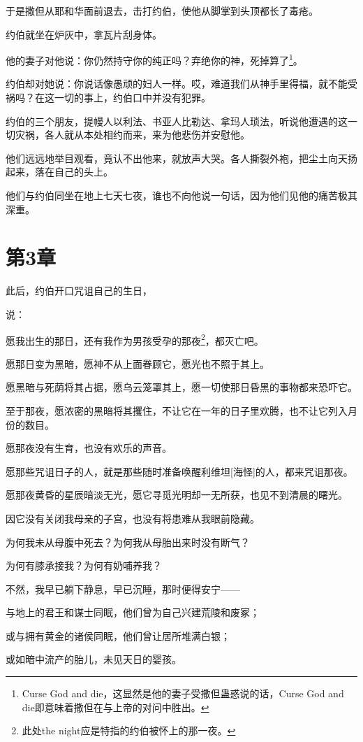 \documentclass[12pt,oneside]{book}
\begin{document}
于是撒但从耶和华面前退去，击打约伯，使他从脚掌到头顶都长了毒疮。

约伯就坐在炉灰中，拿瓦片刮身体。

他的妻子对他说：你仍然持守你的纯正吗？弃绝你的神，死掉算了\footnote{Curse God and die，这显然是他的妻子受撒但蛊惑说的话，Curse God and die即意味着撒但在与上帝的对问中胜出。}。

约伯却对她说：你说话像愚顽的妇人一样。哎，难道我们从神手里得福，就不能受祸吗？在这一切的事上，约伯口中并没有犯罪。

约伯的三个朋友，提幔人以利法、书亚人比勒达、拿玛人琐法，听说他遭遇的这一切灾祸，各人就从本处相约而来，来为他悲伤并安慰他。

他们远远地举目观看，竟认不出他来，就放声大哭。各人撕裂外袍，把尘土向天扬起来，落在自己的头上。

他们与约伯同坐在地上七天七夜，谁也不向他说一句话，因为他们见他的痛苦极其深重。


\chapter{第3章}
此后，约伯开口咒诅自己的生日，

说：

愿我出生的那日，还有我作为男孩受孕的那夜\footnote{此处the night应是特指的约伯被怀上的那一夜。}，都灭亡吧。

愿那日变为黑暗，愿神不从上面眷顾它，愿光也不照于其上。

愿黑暗与死荫将其占据，愿乌云笼罩其上，愿一切使那日昏黑的事物都来恐吓它。

至于那夜，愿浓密的黑暗将其攫住，不让它在一年的日子里欢腾，也不让它列入月份的数目。

愿那夜没有生育，也没有欢乐的声音。

愿那些咒诅日子的人，就是那些随时准备唤醒利维坦[海怪]的人，都来咒诅那夜。

愿那夜黄昏的星辰暗淡无光，愿它寻觅光明却一无所获，也见不到清晨的曙光。

因它没有关闭我母亲的子宫，也没有将患难从我眼前隐藏。

为何我未从母腹中死去？为何我从母胎出来时没有断气？

为何有膝承接我？为何有奶哺养我？

不然，我早已躺下静息，早已沉睡，那时便得安宁——

与地上的君王和谋士同眠，他们曾为自己兴建荒陵和废冢；

或与拥有黄金的诸侯同眠，他们曾让居所堆满白银；

或如暗中流产的胎儿，未见天日的婴孩。
\end{document}
